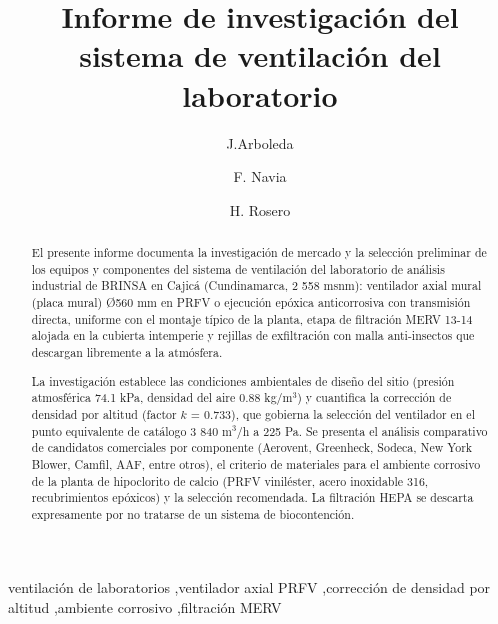 \pagestyle{corporativo}

\begin{frontmatter}

	\title{Informe de investigación del sistema de ventilación del laboratorio}

	\author[inst1]{J.Arboleda}

	\author[inst1]{F. Navia}

	\author[inst2]{H. Rosero}

	\address[inst1]{DML Ingenieros consultores, Cali, Colombia, 760025}
	\address[inst2]{Especialidad Mecánica y Procesos, Cali, Colombia}

	\begin{abstract}
		\thispagestyle{corporativo}
		El presente informe documenta la investigación de mercado y la selección preliminar de los equipos y componentes del sistema de ventilación del laboratorio de análisis industrial de BRINSA en Cajicá (Cundinamarca, 2 558 msnm): ventilador axial mural (placa mural) Ø560 mm en PRFV o ejecución epóxica anticorrosiva con transmisión directa, uniforme con el montaje típico de la planta, etapa de filtración MERV 13-14 alojada en la cubierta intemperie y rejillas de exfiltración con malla anti-insectos que descargan libremente a la atmósfera.

		La investigación establece las condiciones ambientales de diseño del sitio (presión atmosférica 74.1 kPa, densidad del aire 0.88 kg/m$^3$) y cuantifica la corrección de densidad por altitud (factor $k$ = 0.733), que gobierna la selección del ventilador en el punto equivalente de catálogo 3 840 m$^3$/h a 225 Pa. Se presenta el análisis comparativo de candidatos comerciales por componente (Aerovent, Greenheck, Sodeca, New York Blower, Camfil, AAF, entre otros), el criterio de materiales para el ambiente corrosivo de la planta de hipoclorito de calcio (PRFV viniléster, acero inoxidable 316, recubrimientos epóxicos) y la selección recomendada. La filtración HEPA se descarta expresamente por no tratarse de un sistema de biocontención.
	\end{abstract}

	\begin{keyword}
		ventilación de laboratorios \sep ventilador axial PRFV \sep corrección de densidad por altitud \sep ambiente corrosivo \sep filtración MERV
	\end{keyword}

\end{frontmatter}

\pagestyle{corporativo}
\thispagestyle{corporativo}
